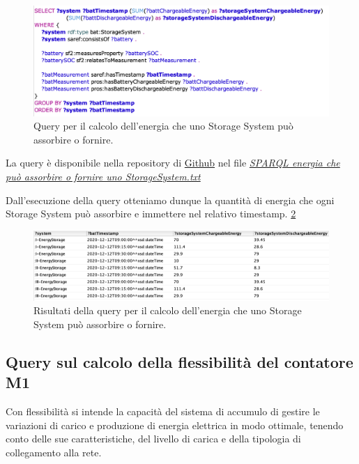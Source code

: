 \begin{figure}[H]
    \centering
    \includegraphics[width=15cm]{images/subquery.png}
    \caption{Query per il calcolo dell'energia che uno Storage System può assorbire o fornire.}
    \label{fig:subquery}
\end{figure}

La query è disponibile nella repository di \href{https://github.com/19eddie/SemanticWeb-Assignment02-03}{Github} nel file \href{https://github.com/19eddie/SemanticWeb-Assignment02-03/blob/main/SPARQL%20energia%20che%20pu%C3%B2%20assorbire%20o%20fornire%20uno%20StorageSystem.txt}{\textit{SPARQL energia che può assorbire o fornire uno StorageSystem.txt}}

Dall'esecuzione della query otteniamo dunque la quantità di energia che ogni Storage System può assorbire e immettere nel relativo timestamp. \ref{fig:subquery_res}

\begin{figure}[H]
    \centering
    \includegraphics[width=15cm]{images/subquery_res.png}
    \caption{Risultati della query per il calcolo dell'energia che uno Storage System può assorbire o fornire.}
    \label{fig:subquery_res}
\end{figure}

\subsection{Query sul calcolo della flessibilità del contatore M1}

Con flessibilità si intende la capacità del sistema di accumulo di gestire le variazioni di carico e produzione di energia elettrica in modo ottimale, tenendo conto delle sue caratteristiche, del livello di carica e della tipologia di collegamento alla rete.

